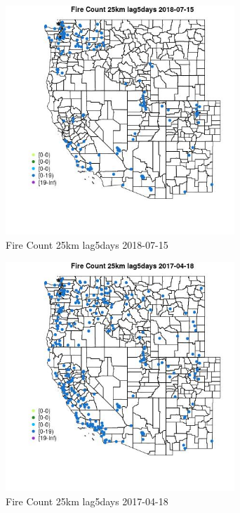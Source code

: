 \begin{figure} 
\centering  
\includegraphics[width=0.77\textwidth]{Code_Outputs/Report_ML_input_PM25_Step4_part_e_de_duplicated_aves_compiled_2019-05-20wNAs_MapObsFire_Count_25km_lag5days2018-07-15.jpg} 
\caption{\label{fig:Report_ML_input_PM25_Step4_part_e_de_duplicated_aves_compiled_2019-05-20wNAsMapObsFire_Count_25km_lag5days2018-07-15}Fire Count 25km lag5days 2018-07-15} 
\end{figure} 
 

\begin{figure} 
\centering  
\includegraphics[width=0.77\textwidth]{Code_Outputs/Report_ML_input_PM25_Step4_part_e_de_duplicated_aves_compiled_2019-05-20wNAs_MapObsFire_Count_25km_lag5days2017-04-18.jpg} 
\caption{\label{fig:Report_ML_input_PM25_Step4_part_e_de_duplicated_aves_compiled_2019-05-20wNAsMapObsFire_Count_25km_lag5days2017-04-18}Fire Count 25km lag5days 2017-04-18} 
\end{figure} 
 


